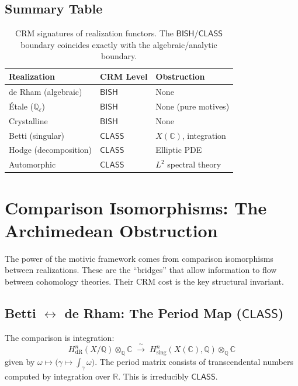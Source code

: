\documentclass[11pt,a4paper]{article}
\theoremstyle{plain}
\theoremstyle{definition}
\newcommand{\BISH}{\textsf{BISH}}
\newcommand{\CLASS}{\textsf{CLASS}}
\newcommand{\Q}{\mathbb{Q}}
\newcommand{\R}{\mathbb{R}}
\newcommand{\C}{\mathbb{C}}
\begin{document}
\subsection{Summary Table}

\begin{table}[h]
\centering
\begin{tabular}{@{}lll@{}}
\toprule
\textbf{Realization} & \textbf{CRM Level} & \textbf{Obstruction} \\
\midrule
de Rham (algebraic) & $\BISH$ & None \\
\'Etale ($\Q_\ell$) & $\BISH$ & None (pure motives) \\
Crystalline & $\BISH$ & None \\
Betti (singular) & $\CLASS$ & $X(\C)$, integration \\
Hodge (decomposition) & $\CLASS$ & Elliptic PDE \\
Automorphic & $\CLASS$ & $L^2$ spectral theory \\
\bottomrule
\end{tabular}
\caption{CRM signatures of realization functors. The $\BISH$/$\CLASS$ boundary coincides exactly with the algebraic/analytic boundary.}
\label{tab:realizations}
\end{table}


\section{Comparison Isomorphisms: The Archimedean Obstruction}\label{sec:comparisons}

The power of the motivic framework comes from comparison isomorphisms between realizations. These are the ``bridges'' that allow information to flow between cohomology theories. Their CRM cost is the key structural invariant.

\subsection{Betti $\leftrightarrow$ de Rham: The Period Map ($\CLASS$)}

The comparison is integration:
\[
H^n_{\mathrm{dR}}(X/\Q) \otimes_\Q \C \;\xrightarrow{\;\sim\;}\; H^n_{\mathrm{sing}}(X(\C), \Q) \otimes_\Q \C
\]
given by $\omega \mapsto \bigl(\gamma \mapsto \int_\gamma \omega\bigr)$. The period matrix consists of transcendental numbers computed by integration over $\R$. This is irreducibly $\CLASS$.
\end{document}
